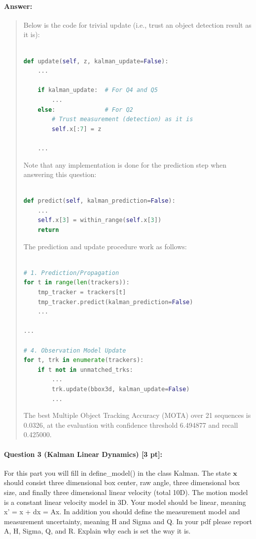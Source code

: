 \documentclass[11pt]{article}
\begin{document}
\paragraph{Answer:} 
\begin{quote}

Below is the code for trivial update (i.e., trust an object detection result as it is):

\begin{lstlisting}[language=Python, basicstyle=\scriptsize]

def update(self, z, kalman_update=False):
    ...

    if kalman_update:  # For Q4 and Q5
        ...
    else:              # For Q2
        # Trust measurement (detection) as it is
        self.x[:7] = z

    ...

\end{lstlisting}

Note that any implementation is done for the prediction step when answering this question:

\begin{lstlisting}[language=Python, basicstyle=\scriptsize]

def predict(self, kalman_prediction=False):
    ...
    self.x[3] = within_range(self.x[3])
    return

\end{lstlisting}

The prediction and update procedure work as follows:

\begin{lstlisting}[language=Python, basicstyle=\scriptsize]

# 1. Prediction/Propagation
for t in range(len(trackers)):
    tmp_tracker = trackers[t]
    tmp_tracker.predict(kalman_prediction=False)
    ...

...

# 4. Observation Model Update
for t, trk in enumerate(trackers):
    if t not in unmatched_trks:
        ...
        trk.update(bbox3d, kalman_update=False)
        ...

\end{lstlisting}

The best Multiple Object Tracking Accuracy (MOTA) over 21 sequences is 0.0326, at the evaluation with confidence threshold 6.494877 and recall 0.425000. 

\end{quote}

\paragraph{Question 3 (Kalman Linear Dynamics) [3 pt]:}
For this part you will fill in define\_model() in the class Kalman. The state $\mathbf{x}$ should consist three dimensional box center, raw angle, three dimensional box size, and finally three dimensional linear velocity (total 10D). The motion model is a constant linear velocity model in 3D. Your model should be linear, meaning x' = x + dx = Ax. In addition you should define the measurement model and measurement uncertainty, meaning H and Sigma and Q. In your pdf please report A, H, Sigma, Q, and R. Explain why each is set the way it is.
\end{document}
